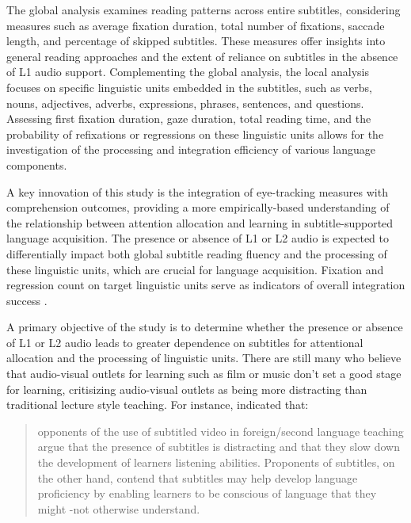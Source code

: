   The global analysis examines reading patterns across entire subtitles,
  considering measures such as average fixation duration, total number
  of fixations, saccade length, and percentage of skipped subtitles.
  These measures offer insights into general reading approaches and the
  extent of reliance on subtitles in the absence of L1 audio support.
  Complementing the global analysis, the local analysis focuses on
  specific linguistic units embedded in the subtitles, such as verbs,
  nouns, adjectives, adverbs, expressions, phrases, sentences, and
  questions. Assessing first fixation duration, gaze duration, total
  reading time, and the probability of refixations or regressions on
  these linguistic units allows for the investigation of the processing
  and integration efficiency of various language components.

  A key innovation of this study is the integration of eye-tracking
  measures with comprehension outcomes, providing a more
  empirically-based understanding of the relationship between attention
  allocation and learning in subtitle-supported language acquisition.
  The presence or absence of L1 or L2 audio is expected to
  differentially impact both global subtitle reading fluency and the
  processing of these linguistic units, which are crucial for language
  acquisition. Fixation and regression count on target linguistic units
  serve as indicators of overall integration success \cite{holmqvist_eye_2011}.

A primary objective of the study is to determine whether the presence or
absence of L1 or L2 audio leads to greater dependence on subtitles for
attentional allocation and the processing of linguistic units. There are
still many who believe that audio-visual outlets for learning such as
film or music don't set a good stage for learning, critisizing
audio-visual outlets as being more distracting than traditional lecture
style teaching. For instance, \textcite[p. 61]{borrás1994} indicated that:

\begin{quote}
opponents of the use of subtitled video in foreign/second language
teaching argue that the presence of subtitles is distracting and that
they slow down the development of learners\textquotesingle{} listening
abilities. Proponents of subtitles, on the other hand, contend that
subtitles may help develop language proficiency by enabling learners to
be conscious of language that they might -not otherwise understand.
\end{quote}

